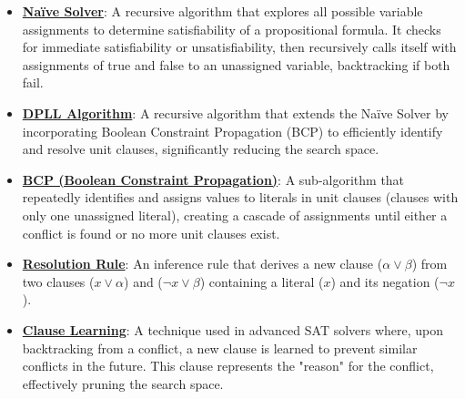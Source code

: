 \documentclass{article}%
\begin{document}
\begin{itemize}[leftmargin=*]%
\item \href{https://purdue.brightspace.com/d2l/common/assets/pdfjs-d2l-dist/1.0.14-legacy/web/viewer.html?file=%2Fcontent%2Fenforced%2F1095467-wl.202510.CS.24300.001%2F15L2-SAT.pdf%3Fou%3D1095467&lang=en-us&container=d2l-fileviewer-rendered-pdf&fullscreen=d2l-fileviewer-rendered-pdf-dialog&height=667#page=18}{\textbf{Naïve Solver}}: A recursive algorithm that explores all possible variable assignments to determine satisfiability of a propositional formula. It checks for immediate satisfiability or unsatisfiability, then recursively calls itself with assignments of true and false to an unassigned variable, backtracking if both fail.%
\item \href{https://purdue.brightspace.com/d2l/common/assets/pdfjs-d2l-dist/1.0.14-legacy/web/viewer.html?file=%2Fcontent%2Fenforced%2F1095467-wl.202510.CS.24300.001%2F15L2-SAT.pdf%3Fou%3D1095467&lang=en-us&container=d2l-fileviewer-rendered-pdf&fullscreen=d2l-fileviewer-rendered-pdf-dialog&height=667#page=17}{\textbf{DPLL Algorithm}}: A recursive algorithm that extends the Naïve Solver by incorporating Boolean Constraint Propagation (BCP) to efficiently identify and resolve unit clauses, significantly reducing the search space.%
\item \href{https://purdue.brightspace.com/d2l/common/assets/pdfjs-d2l-dist/1.0.14-legacy/web/viewer.html?file=%2Fcontent%2Fenforced%2F1095467-wl.202510.CS.24300.001%2F15L2-SAT.pdf%3Fou%3D1095467&lang=en-us&container=d2l-fileviewer-rendered-pdf&fullscreen=d2l-fileviewer-rendered-pdf-dialog&height=667#page=20}{\textbf{BCP (Boolean Constraint Propagation)}}: A sub-algorithm that repeatedly identifies and assigns values to literals in unit clauses (clauses with only one unassigned literal), creating a cascade of assignments until either a conflict is found or no more unit clauses exist.%
\item \href{https://purdue.brightspace.com/d2l/common/assets/pdfjs-d2l-dist/1.0.14-legacy/web/viewer.html?file=%2Fcontent%2Fenforced%2F1095467-wl.202510.CS.24300.001%2F15L2-SAT.pdf%3Fou%3D1095467&lang=en-us&container=d2l-fileviewer-rendered-pdf&fullscreen=d2l-fileviewer-rendered-pdf-dialog&height=667#page=32}{\textbf{Resolution Rule}}: An inference rule that derives a new clause ($α ∨ β$) from two clauses ($x ∨ α$) and ($¬x ∨ β$) containing a literal ($x$) and its negation ($¬x$).%
\item \href{https://purdue.brightspace.com/d2l/common/assets/pdfjs-d2l-dist/1.0.14-legacy/web/viewer.html?file=%2Fcontent%2Fenforced%2F1095467-wl.202510.CS.24300.001%2F15L2-SAT.pdf%3Fou%3D1095467&lang=en-us&container=d2l-fileviewer-rendered-pdf&fullscreen=d2l-fileviewer-rendered-pdf-dialog&height=667#page=35}{\textbf{Clause Learning}}: A technique used in advanced SAT solvers where, upon backtracking from a conflict, a new clause is learned to prevent similar conflicts in the future. This clause represents the "reason" for the conflict, effectively pruning the search space.%
\end{itemize}%
\end{document}
